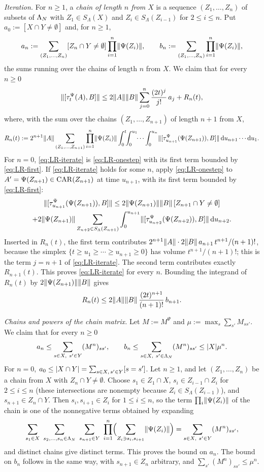 \emph{Iteration.} For $n\ge1$, a \emph{chain of length $n$ from $X$} is a sequence $(Z_1,\dots,Z_n)$ of subsets of
$\Lambda_N$ with $Z_1\in S_\Lambda(X)$ and $Z_i\in S_\Lambda(Z_{i-1})$ for $2\le i\le n$. Put $a_0:=[X\cap Y\ne\emptyset]$ and,
for $n\ge1$,
\[
a_n:=\sum_{(Z_1,\dots,Z_n)}[Z_n\cap Y\ne\emptyset]\prod_{i=1}^n\lVert\Psi(Z_i)\rVert,\qquad
b_n:=\sum_{(Z_1,\dots,Z_n)}\prod_{i=1}^n\lVert\Psi(Z_i)\rVert,
\]
the sums running over the chains of length $n$ from $X$. We claim that for every $n\ge0$
\begin{equation}\label{eq:LR-iterate}
\lVert[\tau^\Psi_t(A),B]\rVert\le2\lVert A\rVert\lVert B\rVert\sum_{j=0}^n\frac{(2t)^j}{j!}\,a_j+R_n(t),
\end{equation}
where, with the sum over the chains $(Z_1,\dots,Z_{n+1})$ of length $n+1$ from $X$,
\[
R_n(t):=2^{n+1}\lVert A\rVert\sum_{(Z_1,\dots,Z_{n+1})}\prod_{i=1}^n\lVert\Psi(Z_i)\rVert
\int_0^t\!\!\int_0^{u_1}\!\!\cdots\int_0^{u_n}\lVert[\tau^\Psi_{u_{n+1}}(\Psi(Z_{n+1})),B]\rVert\,\mathrm{d} u_{n+1}\cdots\mathrm{d} u_1 .
\]
For $n=0$, \eqref{eq:LR-iterate} is \eqref{eq:LR-onestep} with its first term bounded by \eqref{eq:LR-first}. If
\eqref{eq:LR-iterate} holds for some $n$, apply \eqref{eq:LR-onestep} to $A'=\Psi(Z_{n+1})\in\mathrm{CAR}(Z_{n+1})$ at time
$u_{n+1}$, with its first term bounded by \eqref{eq:LR-first}:
\begin{multline*}
\lVert[\tau^\Psi_{u_{n+1}}(\Psi(Z_{n+1})),B]\rVert\le2\lVert\Psi(Z_{n+1})\rVert\lVert B\rVert\,[Z_{n+1}\cap Y\ne\emptyset]\\
+2\lVert\Psi(Z_{n+1})\rVert\sum_{Z_{n+2}\in S_\Lambda(Z_{n+1})}\int_0^{u_{n+1}}\lVert[\tau^\Psi_{u_{n+2}}(\Psi(Z_{n+2})),B]\rVert\,\mathrm{d} u_{n+2}.
\end{multline*}
Inserted in $R_n(t)$, the first term contributes $2^{n+1}\lVert A\rVert\cdot2\lVert B\rVert\,a_{n+1}\,t^{n+1}/(n+1)!$, because the
simplex $\{t\ge u_1\ge\cdots\ge u_{n+1}\ge0\}$ has volume $t^{n+1}/(n+1)!$; this is the term $j=n+1$ of
\eqref{eq:LR-iterate}. The second term contributes exactly $R_{n+1}(t)$. This proves \eqref{eq:LR-iterate} for every $n$.
Bounding the integrand of $R_n(t)$ by $2\lVert\Psi(Z_{n+1})\rVert\lVert B\rVert$ gives
\[
R_n(t)\le2\lVert A\rVert\lVert B\rVert\,\frac{(2t)^{n+1}}{(n+1)!}\,b_{n+1}.
\]

\emph{Chains and powers of the chain matrix.} Let $M:=M^\Psi$ and $\mu:=\max_s\sum_{s'}M_{ss'}$. We claim that for every
$n\ge0$
\[
a_n\le\sum_{s\in X,\ s'\in Y}(M^n)_{ss'},\qquad b_n\le\sum_{s\in X,\ s'\in\Lambda_N}(M^n)_{ss'}\le\lvert X\rvert\mu^n .
\]
For $n=0$, $a_0\le\lvert X\cap Y\rvert=\sum_{s\in X,\,s'\in Y}[s=s']$. Let $n\ge1$, and let $(Z_1,\dots,Z_n)$ be a chain from $X$
with $Z_n\cap Y\ne\emptyset$. Choose $s_1\in Z_1\cap X$, $s_i\in Z_{i-1}\cap Z_i$ for $2\le i\le n$ (these intersections are
nonempty because $Z_i\in S_\Lambda(Z_{i-1})$), and $s_{n+1}\in Z_n\cap Y$. Then $s_i,s_{i+1}\in Z_i$ for $1\le i\le n$, so the
term $\prod_i\lVert\Psi(Z_i)\rVert$ of the chain is one of the nonnegative terms obtained by expanding
\[
\sum_{s_1\in X}\ \sum_{s_2,\dots,s_n\in\Slots}\ \sum_{s_{n+1}\in Y}\ \prod_{i=1}^n\Bigl(\sum_{Z_i\ni s_i,s_{i+1}}\norm{\Psi(Z_i)}\Bigr)
=\sum_{s\in X,\ s'\in Y}(M^n)_{ss'},
\]
and distinct chains give distinct terms. This proves the bound on $a_n$. The bound on $b_n$ follows in the same way,
with $s_{n+1}\in Z_n$ arbitrary, and $\sum_{s'}(M^n)_{ss'}\le\mu^n$.

